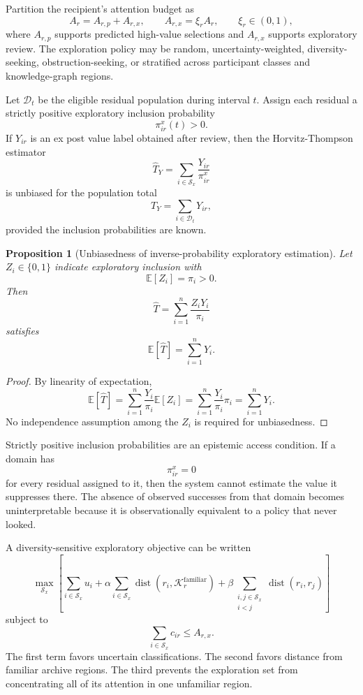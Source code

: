 \documentclass[11pt]{article}
\newtheorem{proposition}[definition]{Proposition}
\theoremstyle{definition}
\DeclareMathOperator{\dist}{dist}
\newcommand{\E}{\mathbb{E}}
\begin{document}
Partition the recipient's attention budget as
\[
A_r=A_{r,p}+A_{r,x},
\qquad
A_{r,x}=\xi_r A_r,
\qquad
\xi_r\in(0,1),
\]
where \(A_{r,p}\) supports predicted high-value selections and \(A_{r,x}\) supports exploratory review. The exploration policy may be random, uncertainty-weighted, diversity-seeking, obstruction-seeking, or stratified across participant classes and knowledge-graph regions.

Let \(\mathcal{D}_t\) be the eligible residual population during interval \(t\). Assign each residual a strictly positive exploratory inclusion probability
\[
\pi_{ir}^{x}(t)>0.
\]
If \(Y_{ir}\) is an ex post value label obtained after review, then the Horvitz-Thompson estimator
\[
\widehat{T}_{Y}
=
\sum_{i\in\mathcal{S}_x}
\frac{Y_{ir}}{\pi_{ir}^{x}}
\]
is unbiased for the population total
\[
T_Y=\sum_{i\in\mathcal{D}_t}Y_{ir},
\]
provided the inclusion probabilities are known.

\begin{proposition}[Unbiasedness of inverse-probability exploratory estimation]
Let \(Z_i\in\{0,1\}\) indicate exploratory inclusion with
\[
\E[Z_i]=\pi_i>0.
\]
Then
\[
\widehat{T}
=
\sum_{i=1}^{n}\frac{Z_iY_i}{\pi_i}
\]
satisfies
\[
\E[\widehat{T}]=\sum_{i=1}^{n}Y_i.
\]
\end{proposition}

\begin{proof}
By linearity of expectation,
\[
\E[\widehat{T}]
=
\sum_{i=1}^{n}
\frac{Y_i}{\pi_i}\E[Z_i]
=
\sum_{i=1}^{n}
\frac{Y_i}{\pi_i}\pi_i
=
\sum_{i=1}^{n}Y_i.
\]
No independence assumption among the \(Z_i\) is required for unbiasedness.
\end{proof}

Strictly positive inclusion probabilities are an epistemic access condition. If a domain has
\[
\pi_{ir}^{x}=0
\]
for every residual assigned to it, then the system cannot estimate the value it suppresses there. The absence of observed successes from that domain becomes uninterpretable because it is observationally equivalent to a policy that never looked.

A diversity-sensitive exploratory objective can be written
\[
\max_{\mathcal{S}_x}
\left[
\sum_{i\in\mathcal{S}_x}u_i
+
\alpha
\sum_{i\in\mathcal{S}_x}
\dist(r_i,\mathcal{K}_{r}^{\mathrm{familiar}})
+
\beta
\sum_{\substack{i,j\in\mathcal{S}_x\\i<j}}
\dist(r_i,r_j)
\right]
\]
subject to
\[
\sum_{i\in\mathcal{S}_x}c_{ir}
\leq
A_{r,x}.
\]
The first term favors uncertain classifications. The second favors distance from familiar archive regions. The third prevents the exploration set from concentrating all of its attention in one unfamiliar region.
\end{document}
